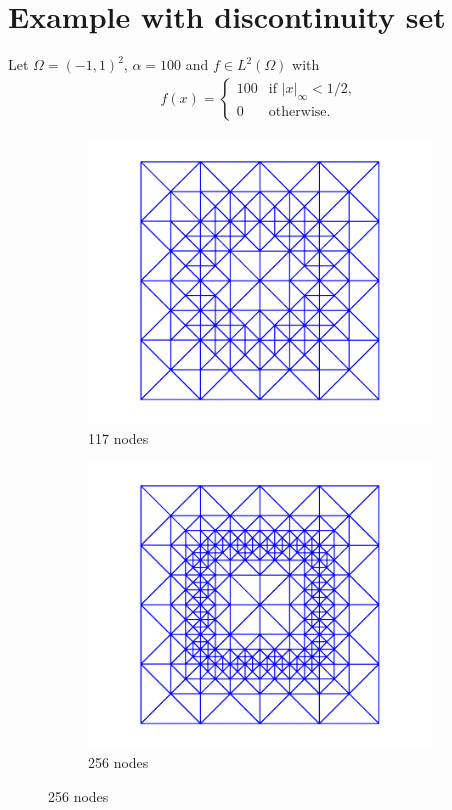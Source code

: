 \documentclass[11p]{article}
\begin{document}
	\section{Example with discontinuity set}
	Let $\Omega = (-1,1)^2$, $\alpha = 100$ and $f \in L^2(\Omega)$ with
	\begin{align*}
		f(x) = \begin{cases}
			100 &\mbox{if } |x|_\infty < 1/2,\\
			0 &\mbox{otherwise}.
		\end{cases}
	\end{align*}
	\begin{figure}[H]
		\centering
		\begin{subfigure}{0.5\linewidth}
			\includegraphics[width=\linewidth]{figures/discSet/adaptTriangulation/adaptTriangulationLevel4} 
			\caption{117 nodes}
		\end{subfigure}\hfill
		\begin{subfigure}{0.5\linewidth}
			\includegraphics[width=\linewidth]{figures/discSet/adaptTriangulation/adaptTriangulationLevel5}
			\caption{256 nodes}
		\end{subfigure}
		

\end{figure}
\end{document}
